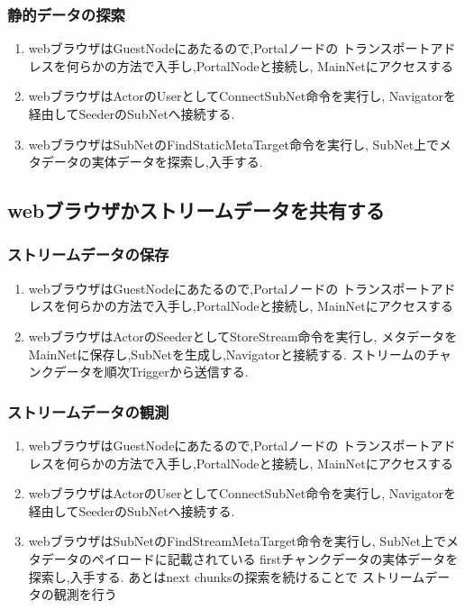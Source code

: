\documentclass[sotsuron]{jcsie}
\begin{document}
\subsubsection{静的データの探索}
\begin{enumerate}
	\item 
	webブラウザはGuestNodeにあたるので,Portalノードの
	トランスポートアドレスを何らかの方法で入手し,PortalNodeと接続し,
	MainNetにアクセスする
	\\
	\item
	webブラウザはActorのUserとしてConnectSubNet命令を実行し,
	Navigatorを経由してSeederのSubNetへ接続する.
	\\
	\item 
	webブラウザはSubNetのFindStaticMetaTarget命令を実行し,
	SubNet上でメタデータの実体データを探索し,入手する.
\end{enumerate}

\subsection{webブラウザかストリームデータを共有する}
\subsubsection{ストリームデータの保存}
\begin{enumerate}
	\item 
	webブラウザはGuestNodeにあたるので,Portalノードの
	トランスポートアドレスを何らかの方法で入手し,PortalNodeと接続し,
	MainNetにアクセスする
	\\
	\item
	webブラウザはActorのSeederとしてStoreStream命令を実行し,
	メタデータをMainNetに保存し,SubNetを生成し,Navigatorと接続する.
	ストリームのチャンクデータを順次Triggerから送信する.	
\end{enumerate}
\subsubsection{ストリームデータの観測}
\begin{enumerate}
	\item 
	webブラウザはGuestNodeにあたるので,Portalノードの
	トランスポートアドレスを何らかの方法で入手し,PortalNodeと接続し,
	MainNetにアクセスする
	\\
	\item
	webブラウザはActorのUserとしてConnectSubNet命令を実行し,
	Navigatorを経由してSeederのSubNetへ接続する.
	\\
	\item 
	webブラウザはSubNetのFindStreamMetaTarget命令を実行し,
	SubNet上でメタデータのペイロードに記載されている
	firstチャンクデータの実体データを探索し,入手する.
	あとはnext chunksの探索を続けることで
	ストリームデータの観測を行う
\end{enumerate}
\end{document}

